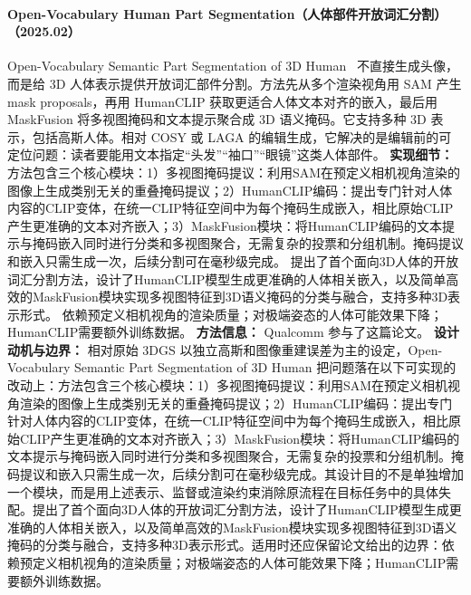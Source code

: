\paragraph{Open-Vocabulary Human Part Segmentation（人体部件开放词汇分割）（2025.02）}
Open-Vocabulary Semantic Part Segmentation of 3D Human~\cite{2502_19782} 不直接生成头像，而是给 3D 人体表示提供开放词汇部件分割。方法先从多个渲染视角用 SAM 产生 mask proposals，再用 HumanCLIP 获取更适合人体文本对齐的嵌入，最后用 MaskFusion 将多视图掩码和文本提示聚合成 3D 语义掩码。它支持多种 3D 表示，包括高斯人体。相对 COSY 或 LAGA 的编辑生成，它解决的是编辑前的可定位问题：读者要能用文本指定“头发”“袖口”“眼镜”这类人体部件。
\textbf{实现细节：} 方法包含三个核心模块：1）多视图掩码提议：利用SAM在预定义相机视角渲染的图像上生成类别无关的重叠掩码提议；2）HumanCLIP编码：提出专门针对人体内容的CLIP变体，在统一CLIP特征空间中为每个掩码生成嵌入，相比原始CLIP产生更准确的文本对齐嵌入；3）MaskFusion模块：将HumanCLIP编码的文本提示与掩码嵌入同时进行分类和多视图聚合，无需复杂的投票和分组机制。掩码提议和嵌入只需生成一次，后续分割可在毫秒级完成。 提出了首个面向3D人体的开放词汇分割方法，设计了HumanCLIP模型生成更准确的人体相关嵌入，以及简单高效的MaskFusion模块实现多视图特征到3D语义掩码的分类与融合，支持多种3D表示形式。 依赖预定义相机视角的渲染质量；对极端姿态的人体可能效果下降；HumanCLIP需要额外训练数据。
\textbf{方法信息：} Qualcomm 参与了这篇论文。
\textbf{设计动机与边界：} 相对原始 3DGS 以独立高斯和图像重建误差为主的设定，Open-Vocabulary Semantic Part Segmentation of 3D Human 把问题落在以下可实现的改动上：方法包含三个核心模块：1）多视图掩码提议：利用SAM在预定义相机视角渲染的图像上生成类别无关的重叠掩码提议；2）HumanCLIP编码：提出专门针对人体内容的CLIP变体，在统一CLIP特征空间中为每个掩码生成嵌入，相比原始CLIP产生更准确的文本对齐嵌入；3）MaskFusion模块：将HumanCLIP编码的文本提示与掩码嵌入同时进行分类和多视图聚合，无需复杂的投票和分组机制。掩码提议和嵌入只需生成一次，后续分割可在毫秒级完成。其设计目的不是单独增加一个模块，而是用上述表示、监督或渲染约束消除原流程在目标任务中的具体失配。提出了首个面向3D人体的开放词汇分割方法，设计了HumanCLIP模型生成更准确的人体相关嵌入，以及简单高效的MaskFusion模块实现多视图特征到3D语义掩码的分类与融合，支持多种3D表示形式。适用时还应保留论文给出的边界：依赖预定义相机视角的渲染质量；对极端姿态的人体可能效果下降；HumanCLIP需要额外训练数据。

